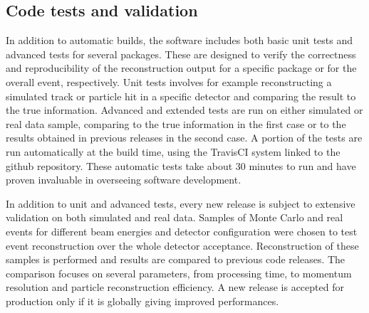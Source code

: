 \subsection{Code tests and validation}\label{sec:tests}
In addition to automatic builds, the software includes both basic unit tests and advanced tests for several packages. These are designed to verify the correctness and reproducibility of the reconstruction output for a specific package or for the overall event, respectively. Unit tests involves for example reconstructing a simulated track or particle hit in a specific detector and comparing the result to the true information. Advanced and extended tests are run on either simulated or real data sample, comparing to the true information in the first case or to the results obtained in previous releases in the second case. A portion of the tests are run automatically at the build time, using the TravisCI system linked to the github repository.  These automatic tests take about 30 minutes to run and have proven invaluable in overseeing software development.

In addition to unit and advanced tests, every new release is subject to extensive validation on both simulated and real data. Samples of Monte Carlo and real events for different beam energies and detector configuration were chosen to test event reconstruction over the whole detector acceptance. Reconstruction of these samples is performed and results are compared to previous code releases. The comparison focuses on several parameters, from processing time, to momentum resolution and particle reconstruction efficiency. A new release is accepted for production only if it is globally giving improved performances. 
